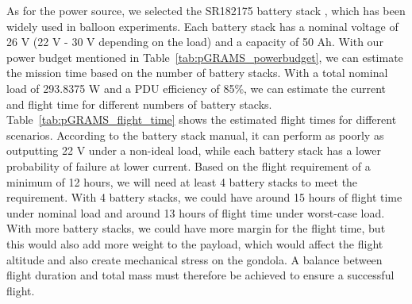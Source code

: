 As for the power source, we selected the SR182175 battery stack \cite{nasa_csbf_sr182175}, which has been widely used in balloon experiments. Each battery stack has a nominal voltage of 26 V (22 V - 30 V depending on the load) and a capacity of 50 Ah. With our power budget mentioned in Table~\ref{tab:pGRAMS_powerbudget}, we can estimate the mission time based on the number of battery stacks. With a total nominal load of 293.8375 W and a \ac{PDU} efficiency of 85\%, we can estimate the current and flight time for different numbers of battery stacks. Table~\ref{tab:pGRAMS_flight_time} shows the estimated flight times for different scenarios. According to the battery stack manual, it can perform as poorly as outputting 22 V under a non-ideal load, while each battery stack has a lower probability of failure at lower current. Based on the flight requirement of a minimum of 12 hours, we will need at least 4 battery stacks to meet the requirement. With 4 battery stacks, we could have around 15 hours of flight time under nominal load and around 13 hours of flight time under worst-case load. With more battery stacks, we could have more margin for the flight time, but this would also add more weight to the payload, which would affect the flight altitude and also create mechanical stress on the gondola. A balance between flight duration and total mass must therefore be achieved to ensure a successful flight.

